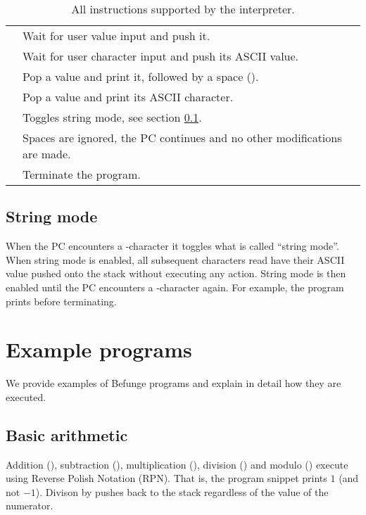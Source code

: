 \documentclass[12pt, a4paper]{article}
\begin{document}
\begin{table}[!hb]
\begin{tabular}{r|l}
\code{\&} & Wait for user value input and push it.\\
\code{\textasciitilde} & Wait for user character input and push its ASCII value.\\
\code{.} & Pop a value and print it, followed by a space (\textvisiblespace).\\
\code{,} & Pop a value and print its ASCII character.\\
\code{"} & Toggles string mode, see section \ref{sec:stringmode}.\\
\code{\textvisiblespace} & Spaces are ignored, the PC continues and no other modifications are made.\\
\code{@} & Terminate the program.
\end{tabular}
\caption{All instructions supported by the interpreter.}
\label{tab:instr}
\end{table}

\subsection{String mode}
\label{sec:stringmode}

When the PC encounters a -character it toggles what is called “string mode”. When string mode is enabled, all subsequent characters read have their ASCII value pushed onto the stack without executing any action. String mode is then enabled until the PC encounters a -character again. For example, the program  prints  before terminating.

\section{Example programs}
\label{sec:examples}

We provide examples of Befunge programs and explain in detail how they are executed.

\subsection{Basic arithmetic}
\label{sec:arith}

Addition (\code{+}), subtraction (\code{-}), multiplication (\code{*}), division (\code{/}) and modulo (\code{\%}) execute using Reverse Polish Notation (RPN). That is, the program snippet  prints $1$ (and not $-1$). Divison by  pushes  back to the stack regardless of the value of the numerator.
\end{document}
